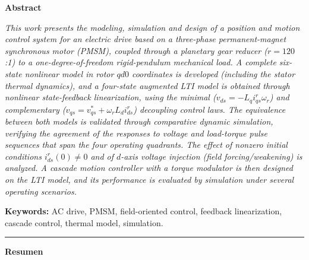 \documentclass[12pt, a4paper,journal, onecolumn, compsoc]{IEEEtran}
\begin{document}
\setcounter{page}{1}
\thispagestyle{fancy}

\vspace*{-1cm}
\noindent\textbf{\large Abstract}
\vspace{4pt}

\noindent\textit{This work presents the modeling, simulation and design of a position and motion control system for an electric drive based on a three-phase permanent-magnet synchronous motor (PMSM), coupled through a planetary gear reducer ($r=120$:1) to a one-degree-of-freedom rigid-pendulum mechanical load. A complete six-state nonlinear model in rotor $qd0$ coordinates is developed (including the stator thermal dynamics), and a four-state augmented LTI model is obtained through nonlinear state-feedback linearization, using the minimal ($v_{ds}=-L_q i_{qs}^r\omega_r$) and complementary ($v_{qs}=v_{qs}^{*}+\omega_r L_d i_{ds}^r$) decoupling control laws. The equivalence between both models is validated through comparative dynamic simulation, verifying the agreement of the responses to voltage and load-torque pulse sequences that span the four operating quadrants. The effect of nonzero initial conditions $i_{ds}^{r}(0)\neq 0$ and of $d$-axis voltage injection (field forcing/weakening) is analyzed. A cascade motion controller with a torque modulator is then designed on the LTI model, and its performance is evaluated by simulation under several operating scenarios.}

\vspace{6pt}
\noindent\textbf{Keywords:} AC drive, PMSM, field-oriented control, feedback linearization, cascade control, thermal model, simulation.

\vspace{8pt}
\noindent\rule{\textwidth}{0.4pt}
\vspace{4pt}

\noindent\textbf{\large Resumen}
\vspace{4pt}
\end{document}
